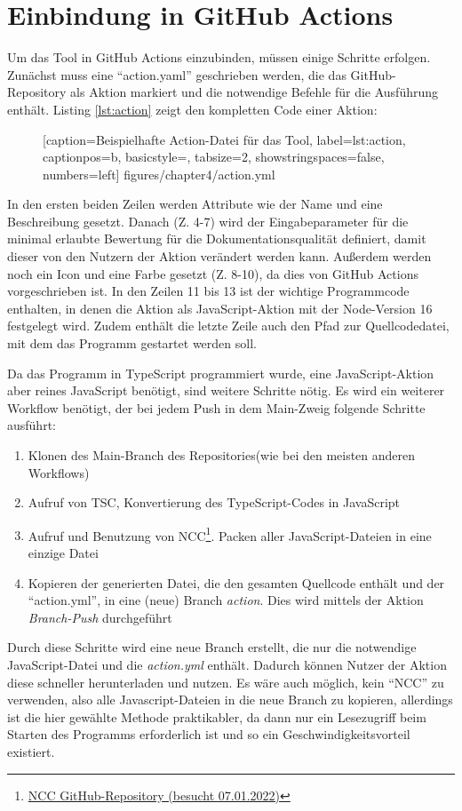   
\section{Einbindung in GitHub Actions}\label{chapter:github_actions_impl}
Um das Tool in GitHub Actions einzubinden, müssen einige Schritte erfolgen. Zunächst muss eine \enquote{action.yaml} geschrieben werden, die das GitHub-Repository als Aktion markiert und die notwendige Befehle für die Ausführung enthält. Listing  \ref{lst:action} zeigt den kompletten Code einer Aktion:
\begin{figure} [htbp]

[caption={Beispielhafte Action-Datei für das Tool},
label={lst:action},
captionpos=b, basicstyle=\footnotesize, tabsize=2, showstringspaces=false,  numbers=left]
{figures/chapter4/action.yml}
\end{figure}

In den ersten beiden Zeilen werden Attribute wie der Name und eine Beschreibung gesetzt. Danach (Z. 4-7) wird der Eingabeparameter für die minimal erlaubte Bewertung für die Dokumentationsqualität definiert, damit dieser von den Nutzern der Aktion verändert werden kann.  Außerdem werden noch ein Icon und eine Farbe gesetzt (Z. 8-10), da dies von GitHub Actions vorgeschrieben ist. In den Zeilen 11 bis 13 ist der wichtige Programmcode enthalten, in denen die Aktion als JavaScript-Aktion mit der Node-Version 16 festgelegt wird. Zudem enthält die letzte Zeile auch den Pfad zur Quellcodedatei, mit dem das Programm gestartet werden soll. 

\bigskip
Da das Programm in TypeScript programmiert wurde, eine JavaScript-Aktion aber reines JavaScript benötigt, sind weitere Schritte nötig. Es wird ein weiterer Workflow benötigt, der bei jedem Push in dem Main-Zweig folgende Schritte ausführt:
\begin{enumerate}
    \item Klonen des Main-Branch des Repositories(wie bei den meisten anderen Workflows)
    \item Aufruf von TSC, Konvertierung des TypeScript-Codes in JavaScript
    \item Aufruf und Benutzung von NCC\footnote{\href{https://github.com/vercel/ncc}{NCC GitHub-Repository (besucht 07.01.2022)}}. Packen aller JavaScript-Dateien in eine einzige Datei
    \item Kopieren der generierten Datei, die den gesamten Quellcode enthält und der \enquote{action.yml}, in eine (neue) Branch \textit{action}. Dies wird mittels der Aktion \textit{Branch-Push}\cite{Branch-Push} durchgeführt
\end{enumerate}
Durch diese Schritte wird eine neue Branch erstellt, die nur die notwendige JavaScript-Datei und die \textit{action.yml} enthält. Dadurch können Nutzer der Aktion diese schneller herunterladen und nutzen. Es wäre auch möglich, kein \enquote{NCC} zu verwenden, also alle Javascript-Dateien in die neue Branch zu kopieren, allerdings ist die hier gewählte Methode praktikabler, da dann nur ein Lesezugriff beim Starten des Programms erforderlich ist und so ein Geschwindigkeitsvorteil existiert. 

